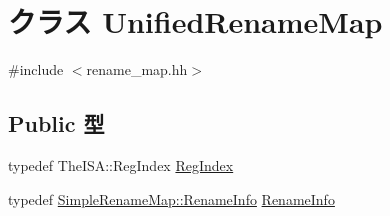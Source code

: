 \hypertarget{classUnifiedRenameMap}{
\section{クラス UnifiedRenameMap}
\label{classUnifiedRenameMap}
}


{\ttfamily \#include $<$rename\_\-map.hh$>$}\subsection*{Public 型}
\begin{DoxyCompactItemize}
\item 
typedef TheISA::RegIndex \hyperlink{classUnifiedRenameMap_a36d25e03e43fa3bb4c5482cbefe5e0fb}{RegIndex}
\item 
typedef \hyperlink{classstd_1_1pair}{SimpleRenameMap::RenameInfo} \hyperlink{classUnifiedRenameMap_a2d31ea626004f32fc5c2aa11da776b42}{RenameInfo}
\end{DoxyCompactItemize}
